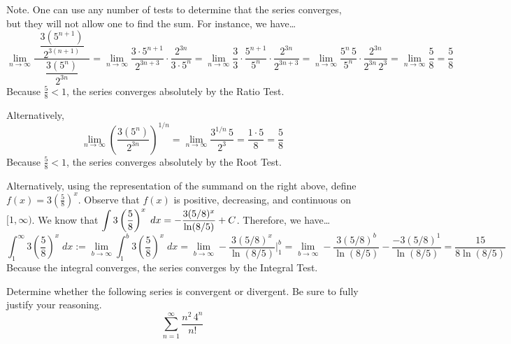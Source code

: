 \documentclass[12pt,letterpaper]{exam}
\begin{document}
\begin{questions}
{{\scriptsize Note. One can use any number of tests to determine that the series converges, but they will not allow one to find the sum. For instance, we have\dots
	\[
	\lim_{n \to \infty} \dfrac{\;\;\dfrac{3 (5^{n+1})}{2^{3(n+1)}}\;\;}{\dfrac{3 (5^n)}{2^{3n}}}= \lim_{n \to \infty} \dfrac{3 \cdot 5^{n + 1}}{2^{3n + 3}} \cdot \dfrac{2^{3n}}{3 \cdot 5^n}= \lim_{n \to \infty} \dfrac{3}{3} \cdot \dfrac{5^{n+1}}{5^n} \cdot \dfrac{2^{3n}}{2^{3n+3}}= \lim_{n \to \infty} \dfrac{5^n \,5}{5^n} \cdot \dfrac{2^{3n}}{2^{3n} \, 2^3}= \lim_{n \to \infty} \dfrac{5}{8}= \dfrac{5}{8}
	\]
Because $\frac{5}{8} < 1$, the series converges absolutely by the Ratio Test. \pspace

Alternatively, 
	\[
	\lim_{n \to \infty} \left( \dfrac{3(5^n)}{2^{3n}} \right)^{1/n}= \lim_{n \to \infty} \dfrac{3^{1/n} \, 5}{2^3}= \dfrac{1 \cdot 5}{8}= \dfrac{5}{8}
	\]
Because $\frac{5}{8} < 1$, the series converges absolutely by the Root Test. \pspace

Alternatively, using the representation of the summand on the right above, define $f(x)= 3 \left(\frac{5}{8}\right)^x$. Observe that $f(x)$ is positive, decreasing, and continuous on $[1, \infty)$. We know that $\displaystyle\int 3 \left(\frac{5}{8}\right)^x \;dx= -\dfrac{3 (5/8)^x}{\ln(8/5)} + C$. Therefore, we have\dots
	\[
	\int_1^\infty 3 \left(\frac{5}{8}\right)^x \;dx:= \lim_{b \to \infty} \int_1^b 3 \left(\frac{5}{8}\right)^x \;dx= \lim_{b \to \infty} -\dfrac{3 (5/8)^x}{\ln(8/5)} \bigg|_1^b= \lim_{b \to \infty} -\dfrac{3 (5/8)^b}{\ln(8/5)} - \dfrac{-3 (5/8)^1}{\ln(8/5)}= \dfrac{15}{8 \ln(8/5)}
	\]
Because the integral converges, the series converges by the Integral Test.
   }
}



\newpage
\question[10] Determine whether the following series is convergent or divergent. Be sure to fully justify your reasoning. 
	\[
	\sum_{n=1}^\infty \dfrac{n^2 \, 4^n}{n!}
	\] \pspace





\end{questions}
\end{document}
